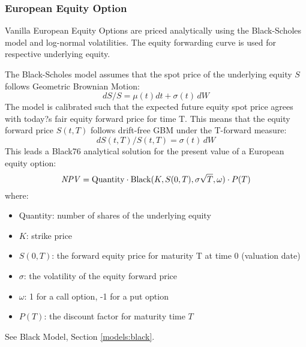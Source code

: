 \subsubsection{European Equity Option}
\label{pricing:eq_option}

Vanilla European Equity Options are priced analytically using the Black-Scholes 
model and log-normal volatilities. The equity forwarding curve is used for 
respective underlying equity.

\medskip
The Black-Scholes model assumes that the spot price of the underlying equity $S$ 
follows Geometric Brownian Motion:
$$
dS/S=\mu(t)dt+\sigma(t)\,dW
$$
The model is calibrated  such that the expected future equity spot price agrees 
with today?s fair equity forward price for time T. This means that the equity 
forward price $S(t,T)$ follows drift-free GBM under the T-forward measure:
$$
dS(t,T)/S(t,T)=\sigma(t)\,dW
$$
This leads a Black76 analytical solution for the present value of a European 
equity option:
$$
\mathit{NPV}=\mbox{Quantity}\cdot \mbox{Black}(K,S(0,T),\sigma \sqrt{T},\omega)\cdot P(T)
$$
where:
\begin{itemize}
\item Quantity: number of shares of the underlying equity
\item $K$: strike price
\item $S(0,T)$: the forward equity price for maturity T at time 0 (valuation date)
\item $\sigma$: the volatility of the equity forward price
\item $\omega$: 1 for a call option, -1 for a put option
\item $P(T)$: the discount factor for maturity time $T$
\end{itemize}

See Black Model, Section \ref{models:black}.

